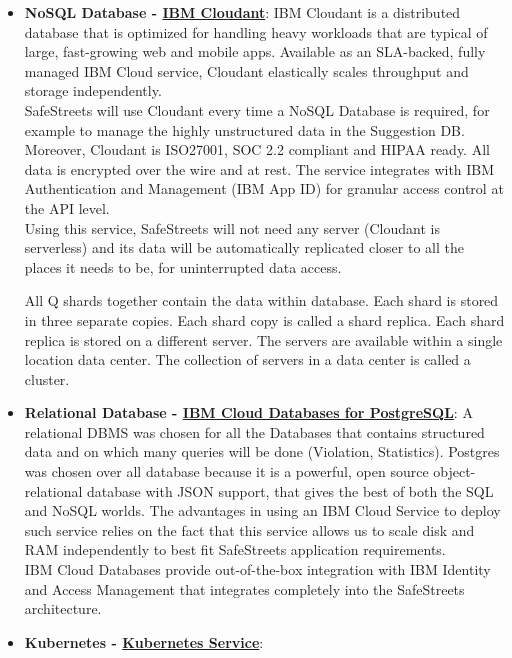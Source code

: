 \begin{itemize}
	\item \textbf{NoSQL Database - \href{https://cloud.ibm.com/catalog/services/cloudant}{IBM Cloudant}}: \hypertarget{cloudant}{} IBM Cloudant is a distributed database that is optimized for handling heavy workloads that are typical of large, fast-growing web and mobile apps. Available as an SLA-backed, fully managed IBM Cloud service, Cloudant elastically scales throughput and storage independently.
	\\SafeStreets will use Cloudant every time a NoSQL Database is required, for example to manage the highly unstructured data in the Suggestion DB.
	Moreover, Cloudant is ISO27001, SOC 2.2 compliant and HIPAA ready. All data is encrypted over the wire and at rest. The service integrates with IBM Authentication and Management (IBM App ID) for granular access control at the API level.
	\\Using this service, SafeStreets will not need any server (Cloudant is serverless) and its data will be automatically replicated closer to all the places it needs to be, for uninterrupted data access.

	All Q shards together contain the data within database. Each shard is stored in three separate copies. Each shard copy is called a shard replica. Each shard replica is stored on a different server. The servers are available within a single location data center. The collection of servers in a data center is called a cluster.
	
	\item \textbf{Relational Database - \href{https://cloud.ibm.com/catalog/services/databases-for-postgresql}{IBM Cloud Databases for PostgreSQL}}: \hypertarget{postgres}{} A relational DBMS was chosen for all the Databases that contains structured data and on which many queries will be done (Violation, Statistics). Postgres was chosen over all database because it is a powerful, open source object-relational database with JSON support, that gives the best of both the SQL and NoSQL worlds. The advantages in using an IBM Cloud Service to deploy such service relies on the fact that this service allows us to scale disk and RAM independently to best fit SafeStreets application requirements.
	\\IBM Cloud Databases provide out-of-the-box integration with IBM Identity and Access Management that integrates completely into the SafeStreets architecture. 

	\item \textbf{Kubernetes - \href{https://cloud.ibm.com/kubernetes/catalog/cluster}{Kubernetes Service}}: \hypertarget{kubernetes}{}
\end{itemize}